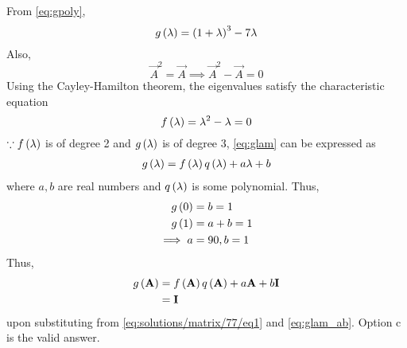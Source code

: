 
 From \eqref{eq:gpoly}, 
\begin{equation}
\label{eq:glam}
g\left(\lambda\right) = \left(1+\lambda\right)^{3}-7\lambda
\end{equation}
%
Also, 
\begin{equation}
 \vec{A}^2 = \vec{A} \implies \vec{A}^2 - \vec{A} = 0 
\end{equation}
Using the Cayley-Hamilton theorem, the eigenvalues satisfy the characteristic equation 
%
\begin{equation}\label{eq:solutions/matrix/77/eq1}
f\left(\lambda\right) = \lambda^2 - \lambda = 0 
\end{equation}
$\because  f\left(\lambda\right)$  is of degree 2 and $g\left(\lambda\right) $ is of degree 3, \eqref{eq:glam} can be expressed as
\begin{align}
	g\left(\lambda\right)	 = f\left(\lambda\right)		q\left(\lambda\right)	+ a\lambda +b
\end{align}
%
where $a, b$ are real numbers and $q\left(\lambda\right)$ is some polynomial.  Thus, 
\begin{align}
	g\left(0\right)	 &= b = 1
	\\
	g\left(1\right)	 &= a+b = 1
	\\
	\implies a &= 90, b = 1
	\label{eq:glam_ab}
\end{align}
Thus, 
\begin{align}
	g\left(\mathbf{A}\right) &= f\left(\mathbf{A}\right)		q\left(\mathbf{A}\right)	+ a\mathbf{A} +b\mathbf{I}
	\\
	&= \mathbf{I}
\end{align}
upon substituting from \eqref{eq:solutions/matrix/77/eq1} and \eqref{eq:glam_ab}.
Option c is the valid answer.

